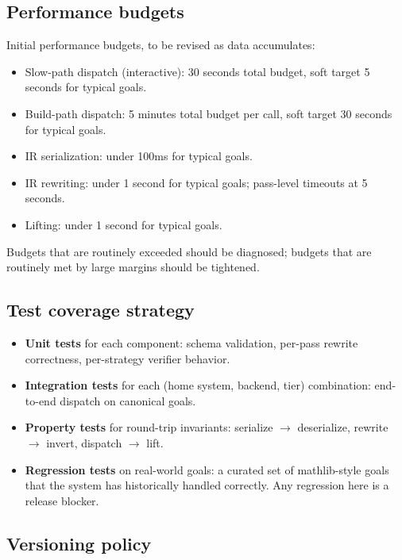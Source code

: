 \documentclass[11pt,letterpaper]{article}
\begin{document}
\subsection{Performance budgets}

Initial performance budgets, to be revised as data accumulates:

\begin{itemize}
  \item Slow-path dispatch (interactive): 30 seconds total budget,
        soft target 5 seconds for typical goals.
  \item Build-path dispatch: 5 minutes total budget per call,
        soft target 30 seconds for typical goals.
  \item IR serialization: under 100ms for typical goals.
  \item IR rewriting: under 1 second for typical goals; pass-level
        timeouts at 5 seconds.
  \item Lifting: under 1 second for typical goals.
\end{itemize}

Budgets that are routinely exceeded should be diagnosed; budgets that
are routinely met by large margins should be tightened.

\subsection{Test coverage strategy}

\begin{itemize}
  \item \textbf{Unit tests} for each component: schema validation,
        per-pass rewrite correctness, per-strategy verifier behavior.
  \item \textbf{Integration tests} for each (home system, backend, tier)
        combination: end-to-end dispatch on canonical goals.
  \item \textbf{Property tests} for round-trip invariants: serialize $\to$
        deserialize, rewrite $\to$ invert, dispatch $\to$ lift.
  \item \textbf{Regression tests} on real-world goals: a curated set
        of mathlib-style goals that the system has historically handled
        correctly. Any regression here is a release blocker.
\end{itemize}

\subsection{Versioning policy}
\end{document}
